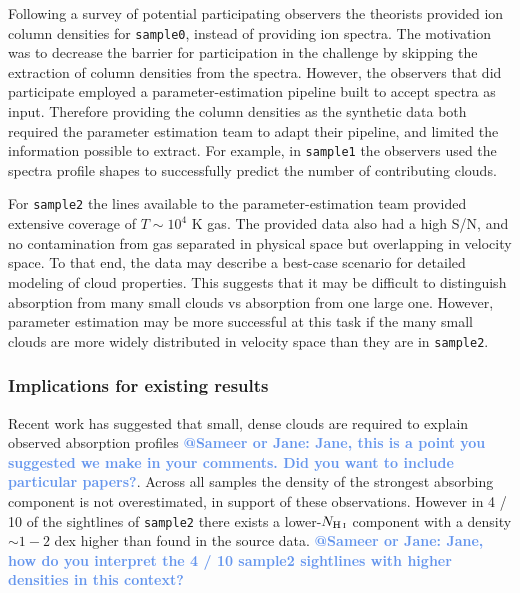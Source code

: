 \documentclass[fleqn,usenatbib]{mnras}
\makeatletter
\newcommand{\atsameer}[1]{\textcolor{CornflowerBlue}{\textbf{@Sameer or Jane: #1}}}
\makeatother
\begin{document}
Following a survey of potential participating observers the theorists provided ion column densities for \texttt{sample0}, instead of providing ion spectra.
The motivation was to decrease the barrier for participation in the challenge by skipping the extraction of column densities from the spectra.
However, the observers that did participate employed a parameter-estimation pipeline built to accept spectra as input.
Therefore providing the column densities as the synthetic data both required the parameter estimation team to adapt their pipeline, and limited the information possible to extract.
For example, in \texttt{sample1} the observers used the spectra profile shapes to successfully predict the number of contributing clouds.

For \texttt{sample2} the lines available to the parameter-estimation team provided extensive coverage of $T \sim 10^4$ K gas.
The provided data also had a high S/N, and no contamination from gas separated in physical space but overlapping in velocity space.
To that end, the data may describe a best-case scenario for detailed modeling of cloud properties.
This suggests that it may be difficult to distinguish absorption from many small clouds vs absorption from one large one.
However, parameter estimation may be more successful at this task if the many small clouds are more widely distributed in velocity space than they are in \texttt{sample2}.

\subsubsection{Implications for existing results}

Recent work has suggested that small, dense clouds are required to explain observed absorption profiles \atsameer{Jane, this is a point you suggested we make in your comments. Did you want to include particular papers?}.
Across all samples the density of the strongest absorbing component is not overestimated,
in support of these observations.
However in 4 / 10 of the sightlines of \texttt{sample2} there exists a lower-$N_{\ion{H}{I}}$ component with a density $\sim 1-2$ dex higher than found in the source data.
\atsameer{Jane, how do you interpret the 4 / 10 sample2 sightlines with higher densities in this context?}
\end{document}
